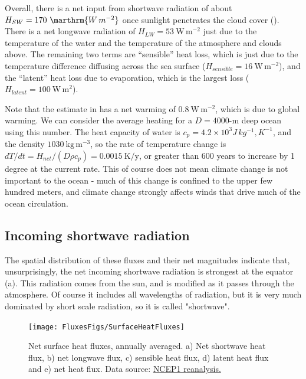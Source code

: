 Overall, there is a net input from shortwave radiation of about $H_{SW} = 170\ \marthrm{W\,m^{-2}}$ once sunlight penetrates the cloud cover (). There is a net longwave radiation of $H_{LW}=53\ \mathrm{W\, m^{-2}}$ just due to the temperature of the water and the temperature of the atmosphere and clouds above.  The remaining two terms are ``sensible'' heat loss, which is just due to the temperature difference diffusing across the sea surface ($H_{sensible}=16\ \mathrm{W\, m^{-2}}$), and the ``latent'' heat loss due to evaporation, which is the largest loss ($H_{latent}=100\ \mathrm{W\, m^{2}}$).  

Note that the estimate in  has a net warming of $0.8\ \mathrm{W\,m^{-2}}$, which is due to global warming.  We can consider the average heating for a $D=4000$-m deep ocean using this number.  The heat capacity of water is $c_p=4.2\times10^{3}J\,kg^{-1},K^{-1}$, and the density $1030\ \mathrm{kg\,m^{-3}}$, so the rate of temperature change is $dT/dt = H_{net} / (D \rho c_p) = 0.0015\ \mathrm{K/y}$, or greater than 600 years to increase by 1 degree at the current rate.  This of course does not mean climate change is not important to the ocean - much of this change is confined to the upper few hundred meters, and climate change strongly affects winds that drive much of the ocean circulation.  

\subsection{Incoming shortwave radiation}

The spatial distribution of these fluxes and their net magnitudes indicate that, unsurprisingly, the net incoming shortwave radiation is strongest at the equator (a).  This radiation comes from the sun, and is modified as it passes through the atmosphere.  Of course it includes all wavelengths of radiation, but it is very much dominated by short scale radiation, so it is called "shortwave".  

\begin{figure}[htb]
  \centering
  \texttt{[image: FluxesFigs/SurfaceHeatFluxes]}
  \caption{Net surface heat fluxes, annually averaged.  a) Net shortwave heat flux, b) net longwave flux, c) sensible heat flux, d) latent heat flux and e) net heat flux. 
  Data source:  \href{https://psl.noaa.gov/data/gridded/data.ncep.reanalysis.derived.surfaceflux.html}{NCEP1 reanalysis.}  }
  \label{fig:SurfaceHeatFluxes}
\end{figure}


